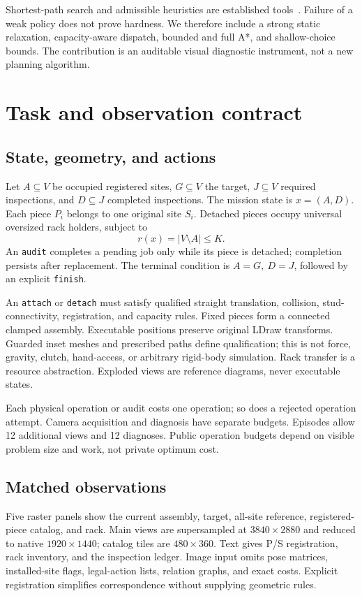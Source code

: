 \documentclass[10pt,twocolumn,letterpaper]{article}
\begin{document}
Shortest-path search and admissible heuristics are established
tools~\cite{astar}. Failure of a weak policy does not prove hardness.
We therefore include a strong static relaxation, capacity-aware dispatch,
bounded and full A*, and shallow-choice bounds. The contribution is
an auditable visual diagnostic instrument, not a new planning algorithm.

\section{Task and observation contract}
\subsection{State, geometry, and actions}
Let $A\subseteq V$ be occupied registered sites, $G\subseteq V$ the
target, $J\subseteq V$ required inspections, and $D\subseteq J$ completed
inspections. The mission state is $x=(A,D)$. Each piece $P_i$ belongs
to one original site $S_i$. Detached pieces occupy universal oversized
rack holders, subject to
\begin{equation}
 r(x)=|V\setminus A|\leq K.
\end{equation}
An \texttt{audit} completes a pending job only while its piece is detached;
completion persists after replacement. The terminal condition is
$A=G,\ D=J$, followed by an explicit \texttt{finish}.

An \texttt{attach} or \texttt{detach} must satisfy qualified straight
translation, collision, stud-connectivity, registration, and capacity
rules. Fixed pieces form a connected clamped assembly. Executable
positions preserve original LDraw transforms. Guarded inset meshes and
prescribed paths define qualification; this is not force, gravity, clutch,
hand-access, or arbitrary rigid-body simulation. Rack transfer is a
resource abstraction. Exploded views are reference diagrams, never
executable states.

Each physical operation or audit costs one operation; so does a rejected
operation attempt. Camera acquisition and diagnosis have separate budgets.
Episodes allow 12 additional views and 12 diagnoses. Public operation
budgets depend on visible problem size and work, not private optimum cost.

\subsection{Matched observations}
Five raster panels show the current assembly, target, all-site reference,
registered-piece catalog, and rack. Main views are supersampled at
$3840\times2880$ and reduced to native $1920\times1440$; catalog tiles
are $480\times360$. Text gives P/S registration, rack inventory, and the
inspection ledger. Image input omits pose matrices, installed-site flags,
legal-action lists, relation graphs, and exact costs. Explicit
registration simplifies correspondence without supplying geometric rules.
\end{document}
